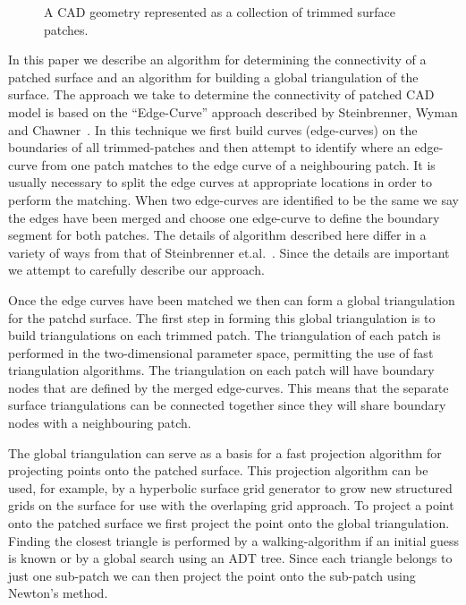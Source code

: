 \documentclass[11pt]{article}
\begin{document}
\begin{figure}[hbt]
  \begin{center}
  \end{center}
\caption{A CAD geometry represented as a collection of trimmed surface patches.} \label{patchedSurface}
\end{figure}

In this paper we describe an algorithm for determining the
connectivity of a patched surface and an algorithm for building a
global triangulation of the surface. 
The approach we take to determine the connectivity of patched CAD model
is based on the ``Edge-Curve'' approach described by Steinbrenner, Wyman and Chawner~\cite{Steinbrenner00}.
In this technique we first build
curves (edge-curves) on the boundaries of all trimmed-patches and then
attempt to identify where an edge-curve from one patch matches to the
edge curve of a neighbouring patch. It is usually necessary to split
the edge curves at appropriate locations in order to perform the
matching. When two edge-curves are identified to be the same we say
the edges have been merged and choose one edge-curve to define the
boundary segment for both patches. The details of algorithm described
here differ in a variety of ways from that of 
Steinbrenner et.al.~\cite{Steinbrenner00}. Since the details are important
we attempt to carefully describe our approach.


Once the edge curves have been matched we then can form a global
triangulation for the patchd surface. The first step in forming this
global triangulation is to build triangulations on each trimmed patch.
The triangulation of each patch is performed in the two-dimensional
parameter space, permitting the use of fast triangulation algorithms.
The triangulation on each patch will have boundary nodes that are
defined by the merged edge-curves.  This means that the separate
surface triangulations can be connected together since they will share
boundary nodes with a neighbouring patch.


The global triangulation can serve as a basis for a fast projection
algorithm for projecting points onto the patched surface. This
projection algorithm can be used, for example, by a hyperbolic surface
grid generator to grow new structured grids on the surface for use
with the overlaping grid approach. To project a point onto the patched
surface we first project the point onto the global
triangulation. Finding the closest triangle is performed by a
walking-algorithm if an initial guess is known or by a global search
using an ADT tree. Since each triangle belongs to just one sub-patch
we can then project the point onto the sub-patch using Newton's
method.
\end{document}
